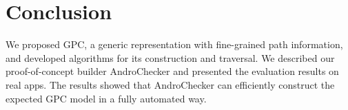  


  

\section{Conclusion}
We proposed GPC, a generic representation with fine-grained path information, and developed algorithms for its construction and traversal. We described our proof-of-concept builder AndroChecker and presented the evaluation results on real apps. The results showed that AndroChecker can efficiently construct the expected GPC model in a fully automated way. 



